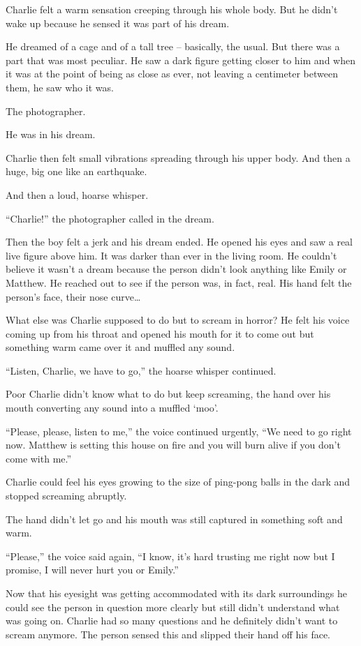 Charlie felt a warm sensation creeping through his whole body. But he didn’t wake up because he sensed it was part of his dream.

He dreamed of a cage and of a tall tree – basically, the usual. But there was a part that was most peculiar. He saw a dark figure getting closer to him and when it was at the point of being as close as ever, not leaving a centimeter between them, he saw who it was.

The photographer.

He was in his dream.

Charlie then felt small vibrations spreading through his upper body. And then a huge, big one like an earthquake.

And then a loud, hoarse whisper.

“Charlie!” the photographer called in the dream.

Then the boy felt a jerk and his dream ended. He opened his eyes and saw a real live figure above him. It was darker than ever in the living room. He couldn’t believe it wasn’t a dream because the person didn’t look anything like Emily or Matthew. He reached out to see if the person was, in fact, real. His hand felt the person’s face, their nose curve…

What else was Charlie supposed to do but to scream in horror? He felt his voice coming up from his throat and opened his mouth for it to come out but something warm came over it and muffled any sound.

“Listen, Charlie, we have to go,” the hoarse whisper continued.

Poor Charlie didn’t know what to do but keep screaming, the hand over his mouth converting any sound into a muffled ‘moo’.

“Please, please, listen to me,” the voice continued urgently, “We need to go right now. Matthew is setting this house on fire and you will burn alive if you don’t come with me.”

Charlie could feel his eyes growing to the size of ping-pong balls in the dark and stopped screaming abruptly.

The hand didn’t let go and his mouth was still captured in something soft and warm.

“Please,” the voice said again, “I know, it’s hard trusting me right now but I promise, I will never hurt you or Emily.”

Now that his eyesight was getting accommodated with its dark surroundings he could see the person in question more clearly but still didn’t understand what was going on. Charlie had so many questions and he definitely didn’t want to scream anymore. The person sensed this and slipped their hand off his face.

